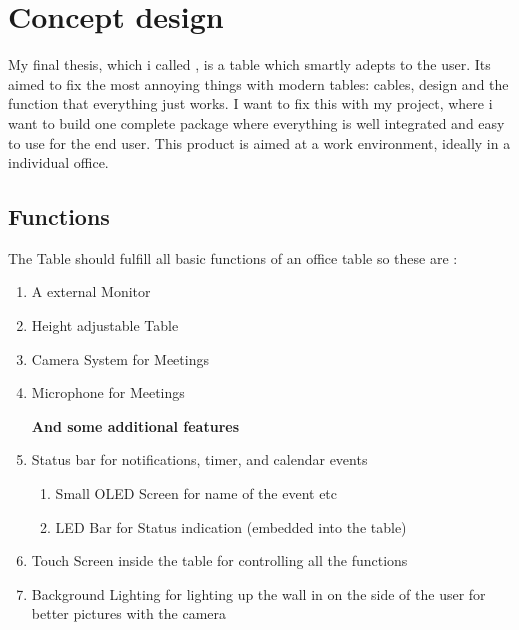 \section{Concept design}
My final thesis, which i called \pjname, is a table which smartly adepts to the user.
Its aimed to fix the most annoying things with modern tables: cables, design and the function that everything just works. I want to fix this with my project, where i want to build one complete package where everything is well integrated and easy to use for the end user. This product is aimed at a work environment, ideally in a individual office. 

\subsection{Functions}
The Table should fulfill all basic functions of an office table so these are : 

\begin{enumerate}
\item A external Monitor 
\item Height adjustable Table
\item Camera System for Meetings
\item Microphone for Meetings
\vspace{0.3cm}

\textbf{And some additional features}

\item Status bar for notifications, timer, and calendar events
\begin{enumerate}
	\item Small OLED Screen for name of the event etc 
	\item LED Bar for Status indication (embedded into the table)
\end{enumerate}
\item Touch Screen inside the table for controlling all the functions
\item Background Lighting for lighting up the wall in on the side of the user for better pictures with the camera
\end{enumerate}

